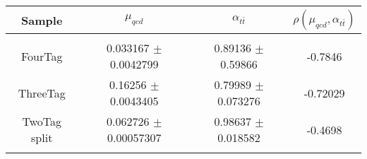 \begin{footnotesize} 
\begin{tabular}{c|c|c|c} 
Sample & $\mu_{qcd}$ & $\alpha_{t\bar{t}}$ & $\rho(\mu_{qcd}, \alpha_{t\bar{t}})$ \\ 
\hline\hline 
& & & \\ 
FourTag & 0.033167 $\pm$ 0.0042799 & 0.89136 $\pm$ 0.59866 & -0.7846\\
ThreeTag & 0.16256 $\pm$ 0.0043405 & 0.79989 $\pm$ 0.073276 & -0.72029\\
TwoTag split & 0.062726 $\pm$ 0.00057307 & 0.98637 $\pm$ 0.018582 & -0.4698\\
& & & \\ 
\hline\hline 
\end{tabular} 
\end{footnotesize} 
\newline 
